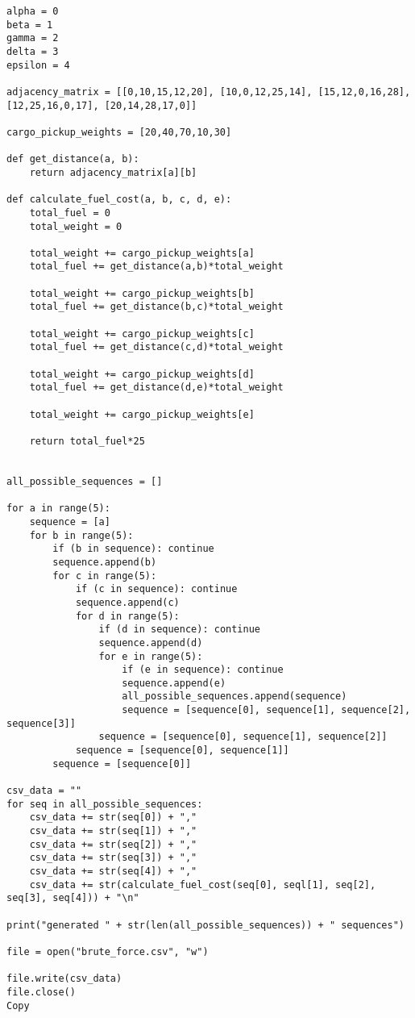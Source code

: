 \documentclass[
]{article}
\begin{document}
\begin{verbatim}
alpha = 0
beta = 1
gamma = 2
delta = 3
epsilon = 4

adjacency_matrix = [[0,10,15,12,20], [10,0,12,25,14], [15,12,0,16,28], [12,25,16,0,17], [20,14,28,17,0]]

cargo_pickup_weights = [20,40,70,10,30]

def get_distance(a, b):
    return adjacency_matrix[a][b]

def calculate_fuel_cost(a, b, c, d, e):
    total_fuel = 0
    total_weight = 0
    
    total_weight += cargo_pickup_weights[a]
    total_fuel += get_distance(a,b)*total_weight

    total_weight += cargo_pickup_weights[b]
    total_fuel += get_distance(b,c)*total_weight

    total_weight += cargo_pickup_weights[c]
    total_fuel += get_distance(c,d)*total_weight

    total_weight += cargo_pickup_weights[d]
    total_fuel += get_distance(d,e)*total_weight

    total_weight += cargo_pickup_weights[e]

    return total_fuel*25


all_possible_sequences = []

for a in range(5):
    sequence = [a]
    for b in range(5):
        if (b in sequence): continue
        sequence.append(b)
        for c in range(5):
            if (c in sequence): continue
            sequence.append(c)
            for d in range(5):
                if (d in sequence): continue
                sequence.append(d)
                for e in range(5):
                    if (e in sequence): continue
                    sequence.append(e)
                    all_possible_sequences.append(sequence)
                    sequence = [sequence[0], sequence[1], sequence[2], sequence[3]]
                sequence = [sequence[0], sequence[1], sequence[2]]
            sequence = [sequence[0], sequence[1]]
        sequence = [sequence[0]]
                    
csv_data = ""
for seq in all_possible_sequences:
    csv_data += str(seq[0]) + ","
    csv_data += str(seq[1]) + ","
    csv_data += str(seq[2]) + ","
    csv_data += str(seq[3]) + ","
    csv_data += str(seq[4]) + ","
    csv_data += str(calculate_fuel_cost(seq[0], seql[1], seq[2], seq[3], seq[4])) + "\n"

print("generated " + str(len(all_possible_sequences)) + " sequences")

file = open("brute_force.csv", "w")

file.write(csv_data)
file.close()
Copy
\end{verbatim}
\end{document}
